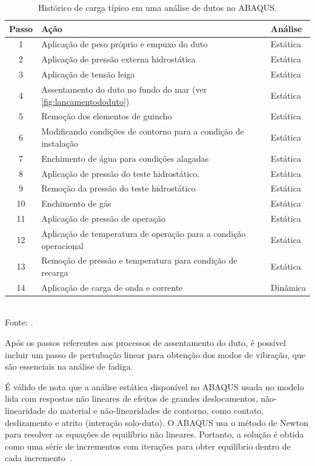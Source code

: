 \begin{table}[!ht]
\renewcommand{\arraystretch}{1.2}
\small
\centering
\caption{Histórico de carga típico em uma análise de dutos no ABAQUS.}\label{tab:load_steps}
\begin{tabular}{cll}
\toprule[1.5pt]

\textbf{Passo} & \textbf{Ação} & \textbf{Análise} \\
\midrule
1 & Aplicação de peso próprio e empuxo do duto & Estática \\
2 & Aplicação de pressão externa hidrostática & Estática \\
3 & Aplicação de tensão leiga & Estática \\
4 & Assentamento do duto no fundo do mar (ver \autoref{fig:lancamentododuto}) & Estática \\
5 & Remoção dos elementos de guincho & Estática \\
6 & Modificando condições de contorno para a condição de instalação & Estática \\
7 & Enchimento de água para condições alagadas & Estática \\
8 & Aplicação de pressão do teste hidrostático. & Estática \\
9 & Remoção da pressão do teste hidrostático & Estática \\
10 & Enchimento de gás & Estática \\
11 & Aplicação de pressão de operação & Estática \\
12 & Aplicação de temperatura de operação para a condição operacional & Estática \\
13 & Remoção de pressão e temperatura para condição de recarga & Estática \\
14 & Aplicação de carga de onda e corrente & Dinâmica \\

\bottomrule[1.25pt]
\end{tabular}
\\[6pt]
Fonte: .
\end{table}

Após os passos referentes aos processos de assentamento do duto, é possível incluir um passo de pertubação linear para obtenção dos modos de vibração, que são essenciais na análise de fadiga.

É válido de nota que a análise estática disponível no ABAQUS usada no modelo lida com respostas não lineares de efeitos de grandes deslocamentos, não-linearidade do material e não-linearidades de contorno, como contato, deslizamento e atrito (interação solo-duto). O ABAQUS usa o método de Newton para resolver as equações de equilíbrio não lineares. Portanto, a solução é obtida como uma série de incrementos com iterações para obter equilíbrio dentro de cada incremento~\cite{SIMULIA2018}.

